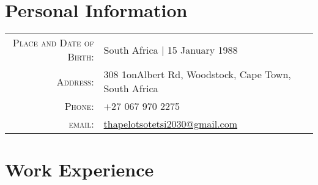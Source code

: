 \documentclass[a4paper,10pt]{article} %
\begin{document}
\pagestyle{empty} %


\par{\bigskip\par} %

\section{Personal Information}

\begin{tabular}{rl}
\textsc{Place and Date of Birth:} & South Africa | 15 January 1988 \\
\textsc{Address:} & 308 1onAlbert Rd, Woodstock, Cape Town, South Africa \\
\textsc{Phone:} & +27 067 970 2275\\
\textsc{email:} & \href{mailto:thapelotsotetsi2030@gmail.com}{thapelotsotetsi2030@gmail.com}
\end{tabular}


\section{Work Experience}
\end{document}
